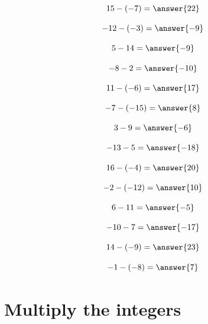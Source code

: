 \documentclass{ximera}
\begin{document}
\begin{problem}
\[
15 - (-7) = \answer{22}
\]
\end{problem}

\begin{problem}
\[
-12 - (-3) = \answer{-9}
\]
\end{problem}

\begin{problem}
\[
5 - 14 = \answer{-9}
\]
\end{problem}

\begin{problem}
\[
-8 - 2 = \answer{-10}
\]
\end{problem}

\begin{problem}
\[
11 - (-6) = \answer{17}
\]
\end{problem}

\begin{problem}
\[
-7 - (-15) = \answer{8}
\]
\end{problem}

\begin{problem}
\[
3 - 9 = \answer{-6}
\]
\end{problem}

\begin{problem}
\[
-13 - 5 = \answer{-18}
\]
\end{problem}

\begin{problem}
\[
16 - (-4) = \answer{20}
\]
\end{problem}

\begin{problem}
\[
-2 - (-12) = \answer{10}
\]
\end{problem}

\begin{problem}
\[
6 - 11 = \answer{-5}
\]
\end{problem}

\begin{problem}
\[
-10 - 7 = \answer{-17}
\]
\end{problem}

\begin{problem}
\[
14 - (-9) = \answer{23}
\]
\end{problem}

\begin{problem}
\[
-1 - (-8) = \answer{7}
\]
\end{problem}

\section*{Multiply the integers}
\end{document}
